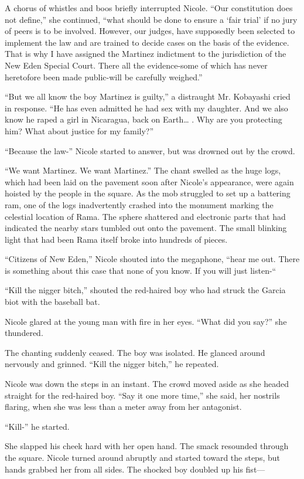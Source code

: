 \documentclass[]{article}
\begin{document}
{A chorus of whistles and boos briefly interrupted Nicole. “Our constitution does not define,” she continued, “what should be done to ensure a ‘fair trial’ if no jury of peers is to be involved. However, our judges, have supposedly been selected to implement the law and are trained to decide cases on the basis of the evidence. That is why I have assigned the Martinez indictment to the jurisdiction of the New Eden Special Court. There all the evidence-some of which has never heretofore been made public-will be carefully weighed.”

“But we all know the boy Martinez is guilty,” a distraught Mr. Kobayashi cried in response. “He has even admitted he had sex with my daughter. And we also know he raped a girl in Nicaragua, back on Earth… . Why are you protecting him? What about justice for my family?”

“Because the law-” Nicole started to answer, but was drowned out by the crowd.

“We want Martinez. We want Martinez.” The chant swelled as the huge logs, which had been laid on the pavement soon after Nicole’s appearance, were again hoisted by the people in the square. As the mob struggled to set up a battering ram, one of the logs inadvertently crashed into the monument marking the celestial location of Rama. The sphere shattered and electronic parts that had indicated the nearby stars tumbled out onto the pavement. The small blinking light that had been Rama itself broke into hundreds of pieces.

“Citizens of New Eden,” Nicole shouted into the megaphone, “hear me out. There is something about this case that none of you know. If you will just listen-“

“Kill the nigger bitch,” shouted the red-haired boy who had struck the Garcia biot with the baseball bat.

Nicole glared at the young man with fire in her eyes. “What did you say?” she thundered.

The chanting suddenly ceased. The boy was isolated. He glanced around nervously and grinned. “Kill the nigger bitch,” he repeated.

Nicole was down the steps in an instant. The crowd moved aside as she headed straight for the red-haired boy. “Say it one more time,” she said, her nostrils flaring, when she was less than a meter away from her antagonist.

“Kill-” he started.

She slapped his cheek hard with her open hand. The smack resounded through the square. Nicole turned around abruptly and started toward the steps, but hands grabbed her from all sides. The shocked boy doubled up his fist—

}
\end{document}
